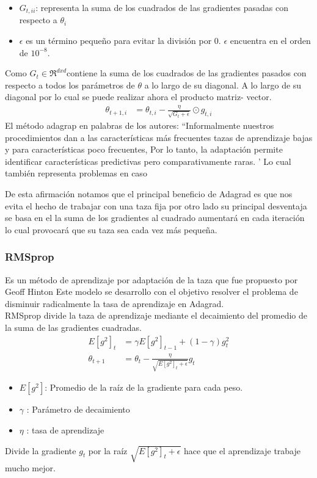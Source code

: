 \begin{itemize}
	\item $G_{t,ii}$: representa la suma de los cuadrados de las gradientes pasadas con respecto a $\theta_{i}$
	\item $\epsilon $ es un término pequeño para evitar la división por 0. $\epsilon$ encuentra en el orden de $10^{-8}$.
\end{itemize}
Como $G_{t} \in \Re^{dxd} $contiene la suma de los cuadrados de las gradientes pasados con respecto a todos los parámetros de $\theta$ a lo largo de su diagonal. A lo largo  de su diagonal por lo cual se puede realizar ahora el producto matriz- vector.
\begin{equation}
\label{adagrad3}
\begin{aligned}
\theta_{t+1,i} &= \theta_{t,i} - \frac{\eta}{\sqrt{G_{t}+\epsilon}} \odot g_{t,i}
\end{aligned}
\end{equation}
El método adagrap en palabras de los autores:
\textquotedblleft Informalmente nuestros procedimientos dan a las características más frecuentes tazas de aprendizaje bajas y para características poco frecuentes, Por lo tanto, la adaptación permite identificar características predictivas pero comparativamente raras. \textquoteright  \cite{ADA} Lo cual también representa problemas en caso


De esta afirmación notamos que el principal beneficio de Adagrad es que nos evita el hecho de trabajar con una taza fija por otro lado su principal desventaja se basa en el la suma de los gradientes al cuadrado aumentará en cada iteración lo cual provocará que su taza sea cada vez más pequeña.


\subsubsection{RMSprop}
Es un método de aprendizaje por adaptación de la taza que fue propuesto por Geoff Hinton
Este modelo se desarrollo con el objetivo resolver el problema de disminuir radicalmente la tasa de aprendizaje en Adagrad.\\ RMSprop divide la taza de aprendizaje mediante el decaimiento del promedio de la suma de las gradientes cuadradas.
\begin{equation}
\label{RMS}
\begin{aligned}
E[g^2]_{t} &= \gamma E[g^2]_{t-1} + (1-\gamma)g^{2}_{t}\\
\theta_{t+1} &= \theta_{t} - \frac{\eta}{\sqrt{E[g^2]_{t} +\epsilon }} g_{t}
\end{aligned}
\end{equation}
\begin{itemize}
	\item $E[g^2]$: Promedio de la raíz de la gradiente para cada peso.
	\item $\gamma$  : Parámetro de decaimiento
	\item $\eta$    : tasa de aprendizaje
\end{itemize}
Divide la gradiente $g_{t}$ por la raíz $\sqrt{E[g^2]_{t} +\epsilon}$ hace que el aprendizaje trabaje mucho mejor.
